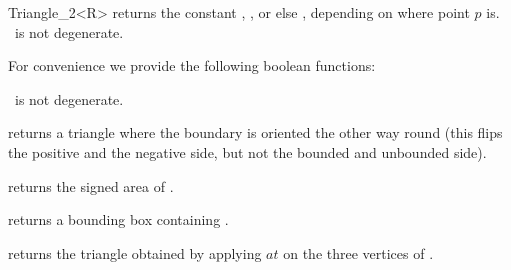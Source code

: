\begin{ccRefClass} {Triangle_2<R>}
       {returns the constant ,
        , or else
        ,
        depending on where point $p$ is.
        \ccPrecond \ccVar\ is not degenerate.}

For convenience we provide the following boolean functions:

       {}
\ccGlue
{}
       {}
\ccGlue
{}
       {}
\ccGlue
{}
       {} 
\ccGlue
{}
       {\ccPrecond \ccVar\ is not degenerate.}


       {returns a triangle where the boundary is oriented the other
        way round (this flips the positive and the negative side, but
        not the bounded and unbounded side).}

       {returns the signed area of \ccVar.}

       {returns a bounding box containing \ccVar.}


       {returns the triangle obtained by applying $at$ on the three
        vertices of \ccVar.}


\end{ccRefClass} 
